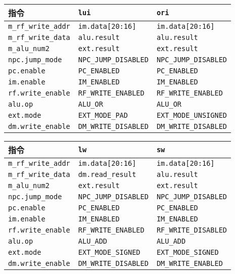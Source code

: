 \begin{longtable}[]{@{}lll@{}}
\toprule
指令 & \texttt{lui} & \texttt{ori}\tabularnewline
\midrule
\endhead
\texttt{m\_rf\_write\_addr} & \texttt{im.data{[}20:16{]}} &
\texttt{im.data{[}20:16{]}}\tabularnewline
\texttt{m\_rf\_write\_data} & \texttt{alu.result} &
\texttt{alu.result}\tabularnewline
\texttt{m\_alu\_num2} & \texttt{ext.result} &
\texttt{ext.result}\tabularnewline
\texttt{npc.jump\_mode} & \texttt{NPC\_JUMP\_DISABLED} &
\texttt{NPC\_JUMP\_DISABLED}\tabularnewline
\texttt{pc.enable} & \texttt{PC\_ENABLED} &
\texttt{PC\_ENABLED}\tabularnewline
\texttt{im.enable} & \texttt{IM\_ENABLED} &
\texttt{IM\_ENABLED}\tabularnewline
\texttt{rf.write\_enable} & \texttt{RF\_WRITE\_ENABLED} &
\texttt{RF\_WRITE\_ENABLED}\tabularnewline
\texttt{alu.op} & \texttt{ALU\_OR} & \texttt{ALU\_OR}\tabularnewline
\texttt{ext.mode} & \texttt{EXT\_MODE\_PAD} &
\texttt{EXT\_MODE\_UNSIGNED}\tabularnewline
\texttt{dm.write\_enable} & \texttt{DM\_WRITE\_DISABLED} &
\texttt{DM\_WRITE\_DISABLED}\tabularnewline
\bottomrule
\end{longtable}

\begin{longtable}[]{@{}lll@{}}
\toprule
指令 & \texttt{lw} & \texttt{sw}\tabularnewline
\midrule
\endhead
\texttt{m\_rf\_write\_addr} & \texttt{im.data{[}20:16{]}} &
\texttt{im.data{[}20:16{]}}\tabularnewline
\texttt{m\_rf\_write\_data} & \texttt{dm.read\_result} &
\texttt{alu.result}\tabularnewline
\texttt{m\_alu\_num2} & \texttt{ext.result} &
\texttt{ext.result}\tabularnewline
\texttt{npc.jump\_mode} & \texttt{NPC\_JUMP\_DISABLED} &
\texttt{NPC\_JUMP\_DISABLED}\tabularnewline
\texttt{pc.enable} & \texttt{PC\_ENABLED} &
\texttt{PC\_ENABLED}\tabularnewline
\texttt{im.enable} & \texttt{IM\_ENABLED} &
\texttt{IM\_ENABLED}\tabularnewline
\texttt{rf.write\_enable} & \texttt{RF\_WRITE\_ENABLED} &
\texttt{RF\_WRITE\_DISABLED}\tabularnewline
\texttt{alu.op} & \texttt{ALU\_ADD} & \texttt{ALU\_ADD}\tabularnewline
\texttt{ext.mode} & \texttt{EXT\_MODE\_SIGNED} &
\texttt{EXT\_MODE\_SIGNED}\tabularnewline
\texttt{dm.write\_enable} & \texttt{DM\_WRITE\_DISABLED} &
\texttt{DM\_WRITE\_ENABLED}\tabularnewline
\bottomrule
\end{longtable}

